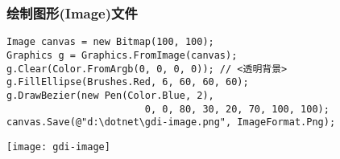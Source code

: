 \begin{frame}[fragile]
\frametitle{绘制图形(Image)文件}
\begin{lstlisting}[escapeinside=<>]
Image canvas = new Bitmap(100, 100);
Graphics g = Graphics.FromImage(canvas);
g.Clear(Color.FromArgb(0, 0, 0, 0)); // <透明背景>
g.FillEllipse(Brushes.Red, 6, 60, 60, 60);
g.DrawBezier(new Pen(Color.Blue, 2),
                        0, 0, 80, 30, 20, 70, 100, 100);
canvas.Save(@"d:\dotnet\gdi-image.png", ImageFormat.Png);
\end{lstlisting}
\texttt{[image: gdi-image]}
\end{frame}







